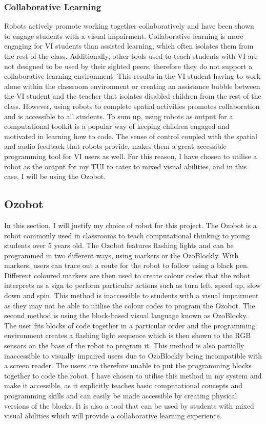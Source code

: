 \documentclass[oneside,%
                    author={Malak Hajji},
                    degree={BSc},
                    title={Designing An Accessible Ozobot Programming Platform for Students},
                  subtitle={With Mixed Visual Abilities}]{dissertation}
\begin{document}
\subsubsection{Collaborative Learning}
Robots actively promote working together collaboratively and have been shown to engage students with a visual impairment\cite{8f}. Collaborative learning is more engaging for VI students than assisted learning, which often isolates them from the rest of the class\cite{43f}. Additionally, other tools used to teach students with VI are not designed to be used by their sighted peers, therefore they do not support a collaborative learning environment. This results in the VI student having to work alone within the classroom environment or creating an assistance bubble between the VI student and the teacher that isolates disabled children from the rest of the class\cite{metatla}. However, using robots to complete spatial activities promotes collaboration and is accessible to all students.
\newline
To sum up, using robots as output for a computational toolkit is a popular way of keeping children engaged and motivated in learning how to code. The sense of control coupled with the spatial and audio feedback that robots provide, makes them a great accessible programming tool for VI users as well. For this reason, I have chosen to utilise a robot as the output for my TUI to cater to mixed visual abilities, and in this case, I will be using the Ozobot.

\subsection{Ozobot}
In this section, I will justify my choice of robot for this project. The Ozobot is a robot commonly used in classrooms to teach computational thinking to young students over 5 years old. The Ozobot features flashing lights and can be programmed in two different ways, using markers or the OzoBlockly. 
With markers, users can trace out a route for the robot to follow using a black pen. Different coloured markers are then used to create colour codes that the robot interprets as a sign to perform particular actions such as turn left, speed up, slow down and spin. This method is inaccessible to students with a visual impairment as they may not be able to utilise the colour codes to program the Ozobot. The second method is using the block-based visual language known as OzoBlocky. The user fits blocks of code together in a particular order and the programming environment creates a flashing light sequence which is then shown to the RGB sensors on the base of the robot to program it. This method is also partially inaccessible to visually impaired users due to OzoBlockly being incompatible with a screen reader. The users are therefore unable to put the programming blocks together to code the robot. I have chosen to utilise this method in my system and make it accessible, as it explicitly teaches basic computational concepts and programming skills and can easily be made accessible by creating physical versions of the blocks. It is also a tool that can be used by students with mixed visual abilities which will provide a collaborative learning experience.
\end{document}

